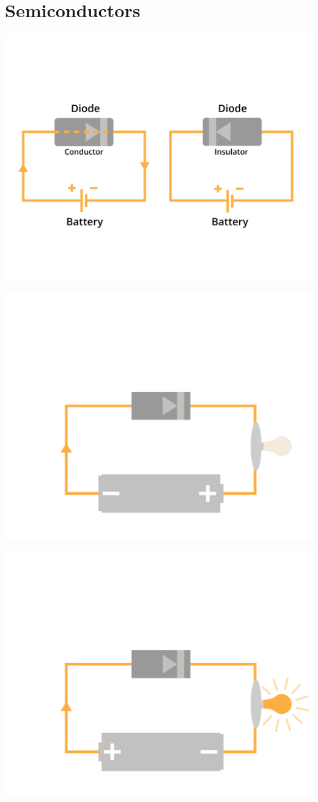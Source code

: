 \chapter{Semiconductors}

\includegraphics[width=.75\textwidth]{diodeIntroAlt.png}

\includegraphics[width=.75\textwidth]{diodeIntro1.png}

\includegraphics[width=.75\textwidth]{diodeIntro2.png}

